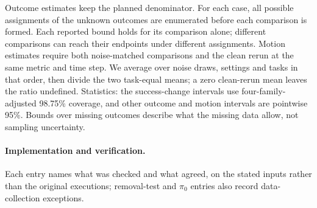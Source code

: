 Outcome estimates keep the planned denominator. For each case, all possible assignments of the unknown outcomes are enumerated before each comparison is formed. Each reported bound holds for its comparison alone; different comparisons can reach their endpoints under different assignments. Motion estimates require both noise-matched comparisons and the clean rerun at the same metric and time step. We average over noise draws, settings and tasks in that order, then divide the two task-equal means; a zero clean-rerun mean leaves the ratio undefined. Statistics: the success-change intervals use four-family-adjusted 98.75\% coverage, and other outcome and motion intervals are pointwise 95\%. Bounds over missing outcomes describe what the missing data allow, not sampling uncertainty.

\paragraph{Implementation and verification.}
Each entry names what was checked and what agreed, on the stated inputs rather than the original executions; removal-test and $\pi_0$ entries also record data-collection exceptions.
